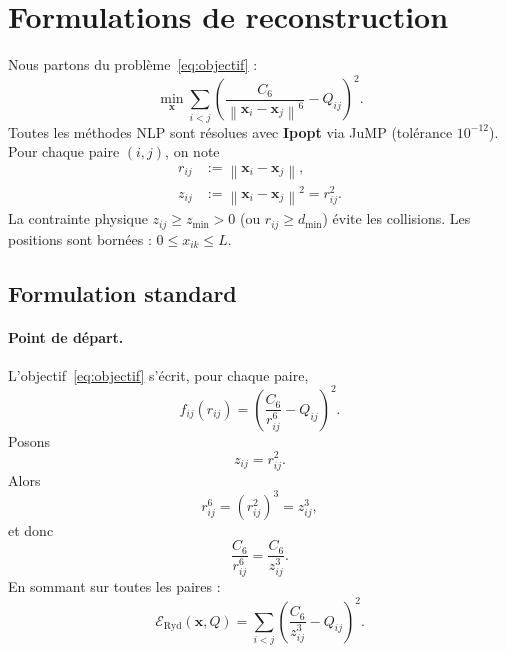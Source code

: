 \documentclass[11pt,a4paper]{article}
\theoremstyle{definition}
\theoremstyle{remark}
\newcommand{\norm}[1]{\left\|#1\right\|}
\newcommand{\Eryd}{\mathcal{E}_{\mathrm{Ryd}}}
\newcommand{\cSix}{C_6}
\begin{document}
\section{Formulations de reconstruction}
\label{sec:formulations}

Nous partons du problème~\eqref{eq:objectif} :
\begin{equation}
  \min_{\mathbf{x}}
  \sum_{i<j}
  \left(
    \frac{\cSix}{\norm{\mathbf{x}_i-\mathbf{x}_j}^6}
    - Q_{ij}
  \right)^2.
\end{equation}
Toutes les méthodes NLP sont résolues avec \textbf{Ipopt} via JuMP
(tolérance $10^{-12}$). Pour chaque paire $(i,j)$, on note
\begin{align}
  r_{ij}
  &:=
  \norm{\mathbf{x}_i-\mathbf{x}_j},
  \\
  z_{ij}
  &:=
  \norm{\mathbf{x}_i-\mathbf{x}_j}^2
  =
  r_{ij}^2.
\end{align}
La contrainte physique $z_{ij} \geq z_{\min} > 0$
(ou $r_{ij} \geq d_{\min}$) évite les collisions.
Les positions sont bornées : $0 \leq x_{ik} \leq L$.

\subsection{Formulation standard}
\label{sec:form-standard}

\paragraph{Point de départ.}
L'objectif~\eqref{eq:objectif} s'écrit, pour chaque paire,
\begin{equation}
  f_{ij}(r_{ij})
  =
  \left(
    \frac{\cSix}{r_{ij}^6}
    - Q_{ij}
  \right)^2.
\end{equation}
Posons
\begin{equation}
  z_{ij}
  =
  r_{ij}^2.
\end{equation}
Alors
\begin{equation}
  r_{ij}^6
  =
  (r_{ij}^2)^3
  =
  z_{ij}^3,
\end{equation}
et donc
\begin{equation}
  \frac{\cSix}{r_{ij}^6}
  =
  \frac{\cSix}{z_{ij}^3}.
\end{equation}
En sommant sur toutes les paires :
\begin{equation}
  \Eryd(\mathbf{x},Q)
  =
  \sum_{i<j}
  \left(
    \frac{\cSix}{z_{ij}^3}
    - Q_{ij}
  \right)^2.
\end{equation}
\end{document}
